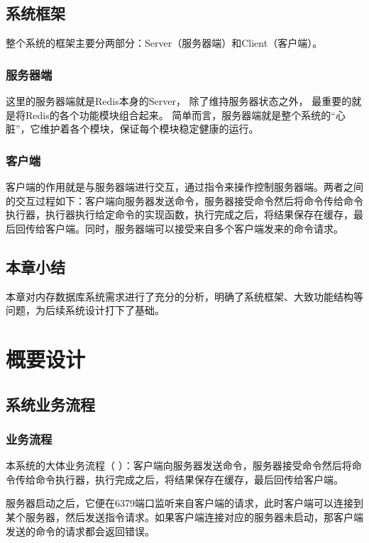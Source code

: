 \documentclass{zjutthesis}
\begin{document}
\section{系统框架}
整个系统的框架主要分两部分：Server（服务器端）和Client（客户端）。
\subsection{服务器端}
这里的服务器端就是Redis本身的Server， 除了维持服务器状态之外， 最重要的就是将Redis的各个功能模块组合起来。
简单而言，服务器端就是整个系统的“心脏”，它维护着各个模块，保证每个模块稳定健康的运行。

\subsection{客户端}
客户端的作用就是与服务器端进行交互，通过指令来操作控制服务器端。两者之间的交互过程如下：客户端向服务器发送命令，服务器接受命令然后将命令传给命令执行器，执行器执行给定命令的实现函数，执行完成之后，将结果保存在缓存，最后回传给客户端。同时，服务器端可以接受来自多个客户端发来的命令请求。

\section{本章小结}
本章对内存数据库系统需求进行了充分的分析，明确了系统框架、大致功能结构等问题，为后续系统设计打下了基础。


\chapter{概要设计}
\section{系统业务流程}
\subsection{业务流程}
本系统的大体业务流程（%
）：客户端向服务器发送命令，服务器接受命令然后将命令传给命令执行器，执行完成之后，将结果保存在缓存，最后回传给客户端。

服务器启动之后，它便在6379端口监听来自客户端的请求，此时客户端可以连接到某个服务器，然后发送指令请求。如果客户端连接对应的服务器未启动，那客户端发送的命令的请求都会返回错误。
\end{document}
